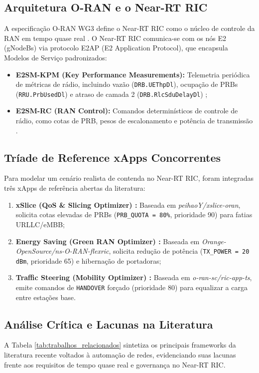 \documentclass[12pt]{article}
\begin{document}
\subsection{Arquitetura O-RAN e o Near-RT RIC}
A especificação O-RAN WG3 define o Near-RT RIC como o núcleo de controle da RAN em tempo quase real \cite{oran_wg3_2023}. O Near-RT RIC comunica-se com os nós E2 (gNodeBs) via protocolo E2AP (E2 Application Protocol), que encapsula Modelos de Serviço padronizados:
\begin{itemize}
    \item \textbf{E2SM-KPM (Key Performance Measurements):} Telemetria periódica de métricas de rádio, incluindo vazão (\texttt{DRB.UEThpDl}), ocupação de PRBs (\texttt{RRU.PrbUsedDl}) e atraso de camada 2 (\texttt{DRB.RlcSduDelayDl}) \cite{e2sm_kpm_2023};
    \item \textbf{E2SM-RC (RAN Control):} Comandos determinísticos de controle de rádio, como cotas de PRB, pesos de escalonamento e potência de transmissão \cite{e2sm_rc_2023}.
\end{itemize}

\subsection{Tríade de Reference xApps Concorrentes}
Para modelar um cenário realista de contenda no Near-RT RIC, foram integradas três xApps de referência abertas da literatura:
\begin{enumerate}
    \item \textbf{xSlice (QoS \& Slicing Optimizer) \cite{xslice_oran}:} Baseada em \textit{peihaoY/xslice-oran}, solicita cotas elevadas de PRBs (\texttt{PRB\_QUOTA = 80\%}, prioridade 90) para fatias URLLC/eMBB;
    \item \textbf{Energy Saving (Green RAN Optimizer) \cite{orange_flexric_es}:} Baseada em \textit{Orange-OpenSource/ns-O-RAN-flexric}, solicita redução de potência (\texttt{TX\_POWER = 20 dBm}, prioridade 65) e hibernação de portadoras;
    \item \textbf{Traffic Steering (Mobility Optimizer) \cite{oransc_ts_xapp}:} Baseada em \textit{o-ran-sc/ric-app-ts}, emite comandos de \texttt{HANDOVER} forçado (prioridade 80) para equalizar a carga entre estações base.
\end{enumerate}

\subsection{Análise Crítica e Lacunas na Literatura}
A Tabela \ref{tab:trabalhos_relacionados} sintetiza os principais frameworks da literatura recente voltados à automação de redes, evidenciando suas lacunas frente aos requisitos de tempo quase real e governança no Near-RT RIC.
\end{document}
